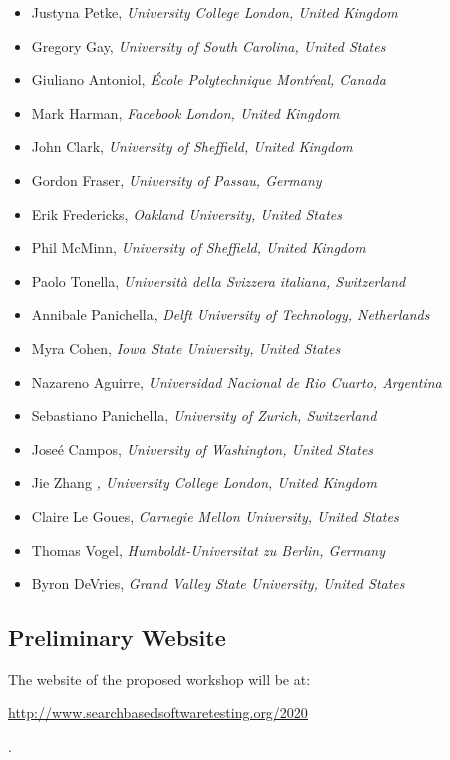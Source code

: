 \documentclass[sigconf,review]{acmart}
\begin{document}
{\small
\begin{itemize}[leftmargin=*]\setlength{\itemsep}{0cm}
\item Justyna Petke, {\it University College London, United Kingdom}
\item Gregory Gay, {\it University of South Carolina, United States}
\item Giuliano Antoniol, {\it \'Ecole Polytechnique Mont\'real, Canada}
\item Mark Harman, {\it Facebook London, United Kingdom}
\item John Clark, {\it University of Sheffield, United Kingdom}
\item Gordon Fraser, {\it University of Passau, Germany}
\item Erik Fredericks, {\it Oakland University, United States}
\item Phil McMinn, {\it University of Sheffield, United Kingdom}
\item Paolo Tonella, {\it Universit\`a della Svizzera italiana, Switzerland}
\item Annibale Panichella, {\it Delft University of Technology, Netherlands}
\item Myra Cohen, {\it Iowa State University, United States}
\item Nazareno Aguirre, {\it Universidad Nacional de Rio Cuarto, Argentina}
\item Sebastiano Panichella, {\it University of Zurich, Switzerland}
\item Jose\'e Campos, {\it University of Washington, United States}
\item Jie Zhang {\it, University College London, United Kingdom}
\item Claire Le Goues, {\it Carnegie Mellon University, United States}
\item Thomas Vogel, {\it Humboldt-Universitat zu Berlin, Germany}
\item Byron DeVries, {\it Grand Valley State University, United States}
\end{itemize}
}
 
\subsection{Preliminary Website}

The website of the proposed workshop will be at:\\\centerline{\url{http://www.searchbasedsoftwaretesting.org/2020}}.
\end{document}
